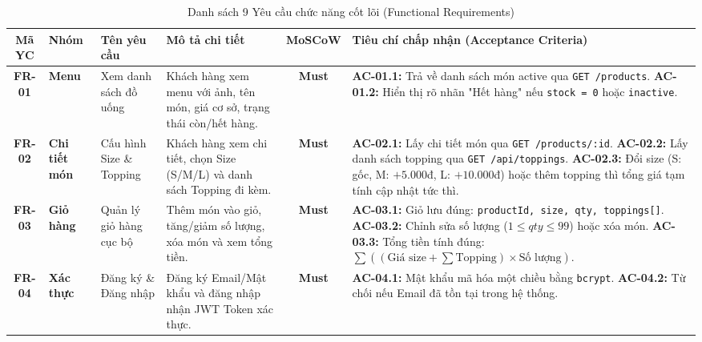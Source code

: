 \documentclass[12pt,a4paper]{article}
\begin{document}
\begin{table}[H]
\centering
\caption{Danh sách 9 Yêu cầu chức năng cốt lõi (Functional Requirements)}
\label{tab:fr}
\vspace{0.2cm}
\footnotesize
\renewcommand{\arraystretch}{1.3}
\begin{tabularx}{\textwidth}{|c|>{\raggedright\arraybackslash}p{2cm}|>{\raggedright\arraybackslash}p{2.8cm}|>{\raggedright\arraybackslash}p{3cm}|c|>{\raggedright\arraybackslash}X|}
\hline
\rowcolor{tableheader}
\textbf{Mã YC} & \textbf{Nhóm} & \textbf{Tên yêu cầu} & \textbf{Mô tả chi tiết} & \textbf{MoSCoW} & \textbf{Tiêu chí chấp nhận (Acceptance Criteria)} \\
\hline
\textbf{FR-01} & \textbf{Menu} & Xem danh sách đồ uống & Khách hàng xem menu với ảnh, tên món, giá cơ sở, trạng thái còn/hết hàng. & \textbf{Must} & 
\textbf{AC-01.1:} Trả về danh sách món active qua \texttt{GET /products}.\newline
\textbf{AC-01.2:} Hiển thị rõ nhãn "Hết hàng" nếu \texttt{stock = 0} hoặc \texttt{inactive}. \\
\hline
\textbf{FR-02} & \textbf{Chi tiết món} & Cấu hình Size \& Topping & Khách hàng xem chi tiết, chọn Size (S/M/L) và danh sách Topping đi kèm. & \textbf{Must} & 
\textbf{AC-02.1:} Lấy chi tiết món qua \texttt{GET /products/:id}.\newline
\textbf{AC-02.2:} Lấy danh sách topping qua \texttt{GET /api/toppings}.\newline
\textbf{AC-02.3:} Đổi size (S: gốc, M: $+5.000$đ, L: $+10.000$đ) hoặc thêm topping thì tổng giá tạm tính cập nhật tức thì. \\
\hline
\textbf{FR-03} & \textbf{Giỏ hàng} & Quản lý giỏ hàng cục bộ & Thêm món vào giỏ, tăng/giảm số lượng, xóa món và xem tổng tiền. & \textbf{Must} & 
\textbf{AC-03.1:} Giỏ lưu đúng: \texttt{productId, size, qty, toppings[]}.\newline
\textbf{AC-03.2:} Chỉnh sửa số lượng ($1 \le qty \le 99$) hoặc xóa món.\newline
\textbf{AC-03.3:} Tổng tiền tính đúng: $\sum ((\text{Giá size} + \sum \text{Topping}) \times \text{Số lượng})$. \\
\hline
\textbf{FR-04} & \textbf{Xác thực} & Đăng ký \& Đăng nhập & Đăng ký Email/Mật khẩu và đăng nhập nhận JWT Token xác thực. & \textbf{Must} & 
\textbf{AC-04.1:} Mật khẩu mã hóa một chiều bằng \texttt{bcrypt}.\newline
\textbf{AC-04.2:} Từ chối nếu Email đã tồn tại trong hệ thống.\newline

\end{tabularx}
\end{table}
\end{document}
